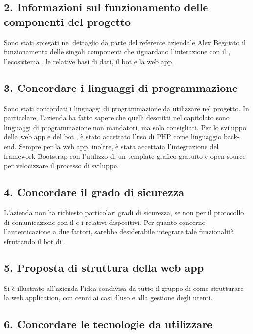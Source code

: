 	\subsection*{2. Informazioni sul funzionamento delle componenti del progetto}

	Sono stati spiegati nel dettaglio da parte del referente aziendale Alex Beggiato il funzionamento delle singoli componenti che riguardano l'interazione con il , l'ecosistema , le relative basi di dati, il bot  e la web app.

	\subsection*{3. Concordare i linguaggi di programmazione}

	Sono stati concordati i linguaggi di programmazione da utilizzare nel progetto. In particolare, l'azienda ha fatto sapere che quelli descritti nel capitolato sono linguaggi di programmazione non mandatori, ma solo consigliati. Per lo sviluppo della web app e del bot , è stato accettato l'uso di PHP come linguaggio back-end. Sempre per la web app, inoltre, è stata accettata l'integrazione del framework Bootstrap con l'utilizzo di un template grafico gratuito e open-source per velocizzare il processo di sviluppo.

	\subsection*{4. Concordare il grado di sicurezza}

	L'azienda non ha richiesto particolari gradi di sicurezza, se non per il protocollo di comunicazione con il  e i relativi dispositivi. Per quanto concerne l'autenticazione a due fattori, sarebbe desiderabile integrare tale funzionalità sfruttando il bot di .

	\subsection*{5. Proposta di struttura della web app}

	Si è illustrato all'azienda l'idea condivisa da tutto il gruppo di come strutturare la web application, con cenni ai casi d'uso e alla gestione degli utenti.

	\subsection*{6. Concordare le tecnologie da utilizzare}

